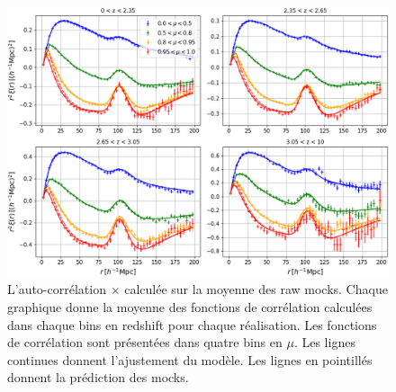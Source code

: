 \begin{figure}
  \centering
  \includegraphics[scale=0.4]{cf_ebossraw_4bins_pred}
  \caption{L'auto-corrélation \lya{}$\times$\lya{} calculée sur la moyenne des \Nmocks{} raw mocks. Chaque graphique donne la moyenne des fonctions de corrélation calculées dans chaque bins en redshift pour chaque réalisation. Les fonctions de corrélation sont présentées dans quatre bins en $\mu$. Les lignes continues donnent l'ajustement du modèle. Les lignes en pointillés donnent la prédiction des mocks.}
  \label{fig:cf_ebossraw_4bins}
\end{figure}


